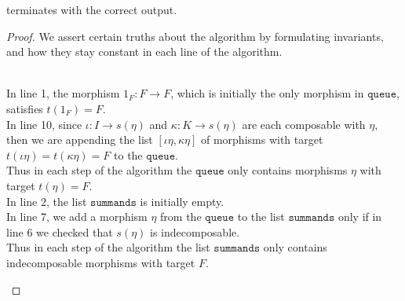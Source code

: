 \begin{proposition}
 terminates with the correct output.
\end{proposition}
\begin{proof} We assert certain truths about the algorithm by formulating invariants, and how they stay constant in each line of the algorithm.\\

\begin{subproof}\phantom{}\\
\noindent In line 1, the morphism $1_{F} : F \rightarrow F$, which is initially the only morphism in $\mathtt{queue}$, satisfies $t(1_{F}) = F$.\\
In line 10, since $\iota : I \rightarrow s(\eta)$ and $\kappa : K \rightarrow s(\eta)$ are each composable with $\eta$, then we are
appending the list $[\iota\eta, \kappa\eta]$ of morphisms with target $t(\iota\eta) = t(\kappa\eta) = F$ to the $\mathtt{queue}$.\\
Thus in each step of the algorithm the $\mathtt{queue}$ only contains morphisms $\eta$ with target $t(\eta) = F$.\\

\noindent In line 2, the list $\mathtt{summands}$ is initially empty.\\
In line 7, we add a morphism $\eta$ from the $\mathtt{queue}$ to the list $\mathtt{summands}$ only if
in line 6 we checked that $s(\eta)$ is indecomposable.\\
Thus in each step of the algorithm the list $\mathtt{summands}$ only contains indecomposable morphisms with target $F$.\\


\end{subproof}
\end{proof}
